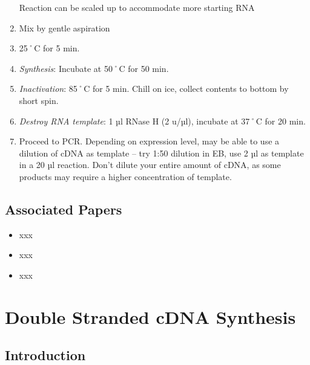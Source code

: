 \documentclass[
  letterpaper,
  DIV=11,
  numbers=noendperiod]{scrreprt}
\providecommand{\tightlist}{%
  \setlength{\itemsep}{0pt}\setlength{\parskip}{0pt}}\usepackage{longtable,booktabs,array}
\begin{document}
\begin{enumerate}
  \begin{tcolorbox}[enhanced jigsaw, toprule=.15mm, breakable, coltitle=black, leftrule=.75mm, title=\textcolor{quarto-callout-important-color}{\faExclamation}\hspace{0.5em}{NOTE}, bottomrule=.15mm, toptitle=1mm, bottomtitle=1mm, colframe=quarto-callout-important-color-frame, opacityback=0, colback=white, opacitybacktitle=0.6, colbacktitle=quarto-callout-important-color!10!white, rightrule=.15mm, titlerule=0mm, arc=.35mm, left=2mm]

  Reaction can be scaled up to accommodate more starting RNA

  \end{tcolorbox}
\item
  Mix by gentle aspiration
\item
  25˚C for 5 min.
\item
  \emph{Synthesis}: Incubate at 50˚C for 50 min.
\item
  \emph{Inactivation}: 85˚C for 5 min. Chill on ice, collect contents to
  bottom by short spin.
\item
  \emph{Destroy RNA template}: 1 µl RNase H (2 u/µl), incubate at 37˚C
  for 20 min.
\item
  Proceed to PCR. Depending on expression level, may be able to use a
  dilution of cDNA as template -- try 1:50 dilution in EB, use 2 µl as
  template in a 20 µl reaction. Don't dilute your entire amount of cDNA,
  as some products may require a higher concentration of template.
\end{enumerate}

\hypertarget{associated-papers-9}{%
\section{Associated Papers}\label{associated-papers-9}}

\begin{itemize}
\tightlist
\item
  xxx
\item
  xxx
\item
  xxx
\end{itemize}

\hypertarget{sec-molecular-dbl_strand_cDNA}{%
\chapter{Double Stranded cDNA
Synthesis}\label{sec-molecular-dbl_strand_cDNA}}

\hypertarget{introduction-12}{%
\section{Introduction}\label{introduction-12}}
\end{document}
